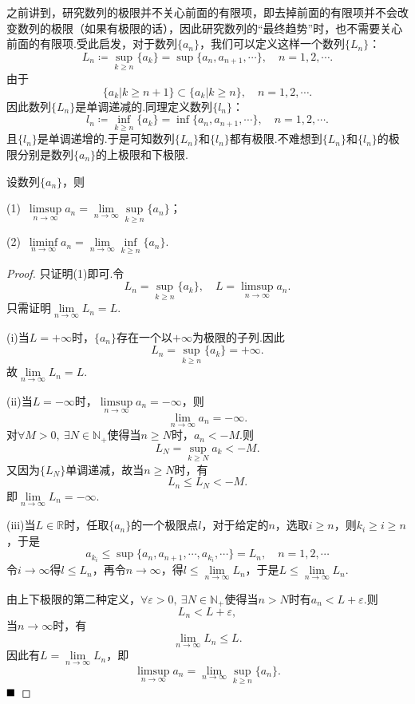 之前讲到，研究数列的极限并不关心前面的有限项，即去掉前面的有限项并不会改变数列的极限（如果有极限的话），因此研究数列的“最终趋势”时，也不需要关心前面的有限项.受此启发，对于数列$\{a_n\}$，我们可以定义这样一个数列$\{L_n\}$：
$$L_n\coloneqq \sup\limits_{k\geqslant n}\{a_k\}=\sup\{a_n,a_{n+1},\cdots\},\quad n=1,2,\cdots.$$
由于
$$\{a_k|k\geqslant n+1\}\subset\{a_k|k\geqslant n\},\quad n=1,2,\cdots.$$
因此数列$\{L_n\}$是单调递减的.同理定义数列$\{l_n\}$：
$$l_n\coloneqq \inf\limits_{k\geqslant n}\{a_k\}=\inf\{a_n,a_{n+1},\cdots\},\quad n=1,2,\cdots.$$
且$\{l_n\}$是单调递增的.于是可知数列$\{L_n\}$和$\{l_n\}$都有极限.不难想到$\{L_n\}$和$\{l_n\}$的极限分别是数列$\{a_n\}$的上极限和下极限.
\begin{theorem}
	设数列$\{a_n\}$，则
	
	(1)\ $\limsup\limits_{n\to\infty}a_n=\lim\limits_{n\to\infty}\sup\limits_{k\geqslant n}\{a_n\}$；
	
	(2)\ $\liminf\limits_{n\to\infty}a_n=\lim\limits_{n\to\infty}\inf\limits_{k\geqslant n}\{a_n\}$.
\end{theorem}
\begin{proof}
	只证明(1)即可.令
	$$L_n=\sup\limits_{k\geqslant n}\{a_k\},\quad L=\limsup\limits_{n\to\infty}a_n.$$
	只需证明$\lim\limits_{n\to\infty}L_n=L.$
	
	(i)当$L=+\infty$时，$\{a_n\}$存在一个以$+\infty$为极限的子列.因此
	$$L_n=\sup\limits_{k\geqslant n}\{a_k\}=+\infty.$$
	故$\lim\limits_{n\to\infty}L_n=L.$
	
	(ii)当$L=-\infty$时，$\limsup\limits_{n \to \infty}a_n=-\infty$，则
	$$\lim\limits_{n\to\infty}a_n=-\infty.$$
	对$\forall M>0,\ \exists N\in \mathbb{N}_+$使得当$n\geqslant N$时，$a_n<-M$.则
	$$L_N=\sup\limits_{k\geqslant N}a_k<-M.$$
	又因为$\{L_N\}$单调递减，故当$n\geqslant N$时，有
	$$L_n\leqslant L_N<-M.$$
	即$\lim\limits_{n\to\infty}L_n=-\infty$.
	
	(iii)当$L\in\mathbb{R}$时，任取$\{a_n\}$的一个极限点$l$，对于给定的$n$，选取$i\geqslant n$，则$k_i\geqslant i\geqslant n$，于是
	$$a_{k_i}\leqslant \sup\{a_n,a_{n+1},\cdots,a_{k_i},\cdots\}=L_n,\quad n=1,2,\cdots$$
	令$i\to\infty$得$l\leqslant L_n$，再令$n\to\infty$，得$l\leqslant \lim\limits_{n\to\infty}L_n$，于是$L\leqslant \lim\limits_{n\to\infty}L_n$.
	
	由上下极限的第二种定义，$\forall \varepsilon>0,\ \exists N\in\mathbb{N}_+$使得当$n>N$时有$a_n<L+\varepsilon.$则
	$$L_n<L+\varepsilon,$$
	当$n\to\infty$时，有
	$$\lim\limits_{n\to\infty}L_n\leqslant L.$$
	因此有$L=\lim\limits_{n \to \infty}L_n$，即
	$$\limsup\limits_{n \to \infty}a_n=\lim\limits_{n\to\infty}\sup\limits_{k\geqslant n}\{a_n\}.$$
	$\hfill\blacksquare$
\end{proof}
